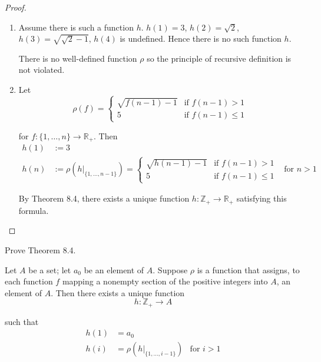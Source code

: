 \begin{proof}
    \begin{enumerate}[label={(\alph*)}]
        \item Assume there is such a function $h$. $h(1) = 3$, $h(2) = \sqrt{2}$, $h(3) = \sqrt{\sqrt{2} - 1}$, $h(4)$ is undefined. Hence there is no such function $h$.

              There is no well-defined function $\rho$ so the principle of recursive definition is not violated.
        \item Let
              \[
                  \rho(f) = \begin{cases}
                      \sqrt{f(n - 1) - 1} & \text{if $f(n - 1) > 1$}   \\
                      5                   & \text{if $f(n - 1)\leq 1$}
                  \end{cases}
              \]

              for $f: \{ 1,\ldots, n \}\to \mathbb{R}_{+}$. Then
              \begin{align*}
                  h(1) & := 3                                                                                    \\
                  h(n) & := \rho(h\vert_{\{ 1,\ldots,n-1 \}}) = \begin{cases}
                                                                    \sqrt{h(n - 1) - 1} & \text{if $f(n - 1) > 1$}   \\
                                                                    5                   & \text{if $f(n - 1)\leq 1$}
                                                                \end{cases} & \text{for $n > 1$}
              \end{align*}

              By Theorem 8.4, there exists a unique function $h: \mathbb{Z}_{+}\to\mathbb{R}_{+}$ satisfying this formula.
    \end{enumerate}
\end{proof}

\begin{exercise}\label{chapter1:section8:exercise7}
    Prove Theorem 8.4.

    Let $A$ be a set; let $a_{0}$ be an element of $A$. Suppose $\rho$ is a function that assigns, to each function $f$ mapping a nonempty section of the positive integers into $A$, an element of $A$. Then there exists a unique function
    \[
        h: \mathbb{Z}_{+}\to A
    \]

    such that
    \begin{align*}
        h(1) & = a_{0}                                                        \\
        h(i) & = \rho(h\vert_{\{1,\ldots,i-1\}}) & \text{for $i > 1$} \tag{*}
    \end{align*}
\end{exercise}

